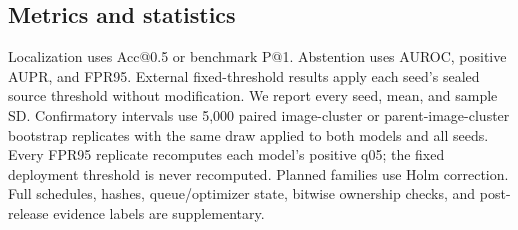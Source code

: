 \subsection{Metrics and statistics}
Localization uses Acc@0.5 or benchmark P@1.  Abstention uses AUROC, positive
AUPR, and FPR95.  External fixed-threshold results apply each seed's sealed
source threshold without modification.  We report every seed, mean, and sample
SD.  Confirmatory intervals use 5,000 paired image-cluster or
parent-image-cluster bootstrap replicates with the same draw applied to both
models and all seeds.  Every FPR95 replicate recomputes each model's positive
q05; the fixed deployment threshold is never recomputed.  Planned families use
Holm correction.  Full schedules, hashes, queue/optimizer state, bitwise
ownership checks, and post-release evidence labels are supplementary.
